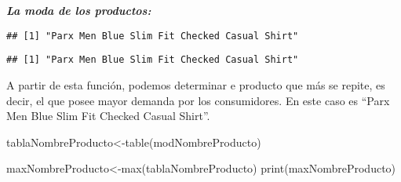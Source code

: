 \documentclass[
]{article}
\newenvironment{Shaded}{\begin{snugshade}}{\end{snugshade}}
\newcommand{\AttributeTok}[1]{\textcolor[rgb]{0.77,0.63,0.00}{#1}}
\newcommand{\CommentTok}[1]{\textcolor[rgb]{0.56,0.35,0.01}{\textit{#1}}}
\newcommand{\ControlFlowTok}[1]{\textcolor[rgb]{0.13,0.29,0.53}{\textbf{#1}}}
\newcommand{\FunctionTok}[1]{\textcolor[rgb]{0.00,0.00,0.00}{#1}}
\newcommand{\NormalTok}[1]{#1}
\newcommand{\OtherTok}[1]{\textcolor[rgb]{0.56,0.35,0.01}{#1}}
\newcommand{\SpecialCharTok}[1]{\textcolor[rgb]{0.00,0.00,0.00}{#1}}
\newcommand{\StringTok}[1]{\textcolor[rgb]{0.31,0.60,0.02}{#1}}
\begin{document}
\textbf{\emph{La moda de los productos: }}

\begin{Shaded}
\end{Shaded}

\begin{verbatim}
## [1] "Parx Men Blue Slim Fit Checked Casual Shirt"
\end{verbatim}

\begin{Shaded}
\end{Shaded}

\begin{verbatim}
## [1] "Parx Men Blue Slim Fit Checked Casual Shirt"
\end{verbatim}

A partir de esta función, podemos determinar e producto que más se
repite, es decir, el que posee mayor demanda por los consumidores. En
este caso es ``Parx Men Blue Slim Fit Checked Casual Shirt''.

\begin{Shaded}
\begin{Highlighting}[]
\NormalTok{tablaNombreProducto}\OtherTok{\textless{}{-}}\FunctionTok{table}\NormalTok{(modNombreProducto)}

\NormalTok{maxNombreProducto}\OtherTok{\textless{}{-}}\FunctionTok{max}\NormalTok{(tablaNombreProducto)}
\FunctionTok{print}\NormalTok{(maxNombreProducto)}
\end{Highlighting}
\end{Shaded}
\end{document}

